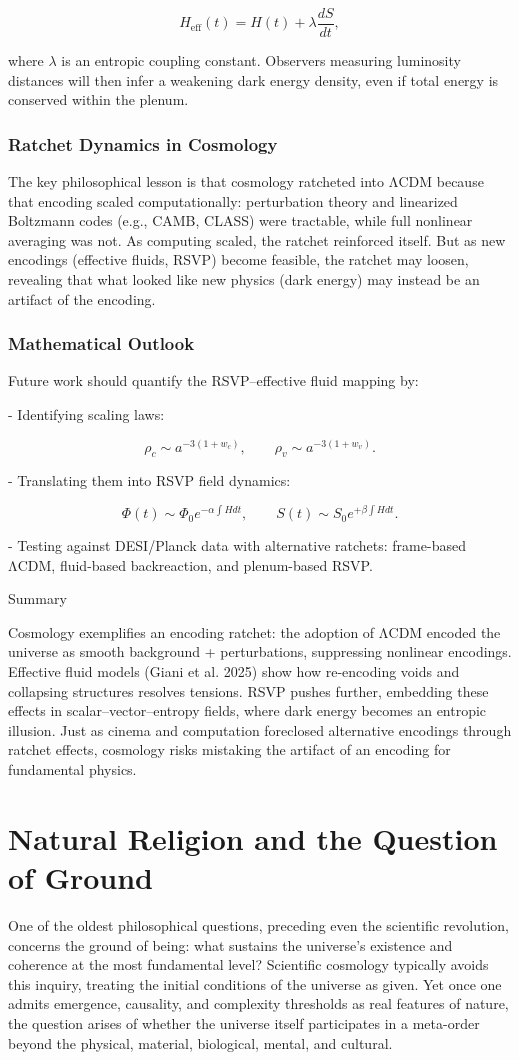\documentclass[12pt]{book}
\begin{document}
\[ H_{\text{eff}}(t) = H(t) + \lambda \frac{dS}{dt}, \]

where \( \lambda \) is an entropic coupling constant. Observers measuring luminosity distances will then infer a weakening dark energy density, even if total energy is conserved within the plenum.

\subsection{Ratchet Dynamics in Cosmology}
The key philosophical lesson is that cosmology ratcheted into ΛCDM because that encoding scaled computationally: perturbation theory and linearized Boltzmann codes (e.g., CAMB, CLASS) were tractable, while full nonlinear averaging was not. As computing scaled, the ratchet reinforced itself. But as new encodings (effective fluids, RSVP) become feasible, the ratchet may loosen, revealing that what looked like new physics (dark energy) may instead be an artifact of the encoding.

\subsection{Mathematical Outlook}
Future work should quantify the RSVP–effective fluid mapping by:

- Identifying scaling laws:

\[ \rho_c \sim a^{-3(1+w_c)}, \qquad \rho_v \sim a^{-3(1+w_v)}. \]

- Translating them into RSVP field dynamics:

\[ \Phi(t) \sim \Phi_0 e^{-\alpha \int H dt}, \qquad S(t) \sim S_0 e^{+\beta \int H dt}. \]

- Testing against DESI/Planck data with alternative ratchets: frame-based ΛCDM, fluid-based backreaction, and plenum-based RSVP.

Summary

Cosmology exemplifies an encoding ratchet: the adoption of ΛCDM encoded the universe as smooth background + perturbations, suppressing nonlinear encodings. Effective fluid models (Giani et al. 2025) show how re-encoding voids and collapsing structures resolves tensions. RSVP pushes further, embedding these effects in scalar–vector–entropy fields, where dark energy becomes an entropic illusion. Just as cinema and computation foreclosed alternative encodings through ratchet effects, cosmology risks mistaking the artifact of an encoding for fundamental physics.

\chapter{Natural Religion and the Question of Ground}
One of the oldest philosophical questions, preceding even the scientific revolution, concerns the ground of being: what sustains the universe’s existence and coherence at the most fundamental level? Scientific cosmology typically avoids this inquiry, treating the initial conditions of the universe as given. Yet once one admits emergence, causality, and complexity thresholds as real features of nature, the question arises of whether the universe itself participates in a meta-order beyond the physical, material, biological, mental, and cultural.
\end{document}
